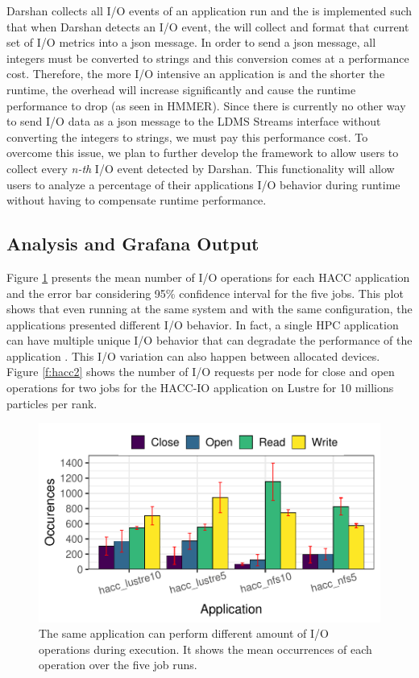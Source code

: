 Darshan collects all I/O events of an application run and the \connector is implemented such that when Darshan detects an I/O event, the \connector will collect and format that current set of I/O metrics into a json message. In order to send a json message, all integers must be converted to strings and this conversion comes at a performance cost. Therefore, the more I/O intensive an application is and the shorter the runtime, the overhead will increase significantly and cause the runtime performance to drop (as seen in HMMER). Since there is currently no other way to send I/O data as a json message to the LDMS Streams interface without converting the integers to strings, we must pay this performance cost. To overcome this issue, we plan to further develop the \Darshan framework to allow users to collect every \emph{n-th} I/O event detected by Darshan. This functionality will allow users to analyze a percentage of their applications I/O behavior during runtime without having to compensate runtime performance.     


\subsection{Analysis and Grafana Output}
Figure \ref{f:hacc} presents the mean number of I/O operations for
each HACC application and the error bar considering 95\% confidence
interval for the five jobs. This plot shows that even running at the
same system and with the same configuration, the applications
presented different I/O behavior. In fact, a single HPC application
can have multiple unique I/O behavior that can degradate the
performance of the application \cite{costa2021}. This I/O variation
can also happen between allocated devices. Figure \ref{f:hacc2} shows
the number of I/O requests per node for close and open operations for
two jobs for the HACC-IO application on Lustre for 10 millions
particles per rank.

\begin{figure}
	\centering
        \includegraphics[width=\linewidth]{figs/operations_hacc.pdf}
	\caption{The same application can perform different amount of
          I/O operations during execution. It shows the mean
          occurrences of each operation over the five job runs.}
	\label{f:hacc}
\end{figure}

